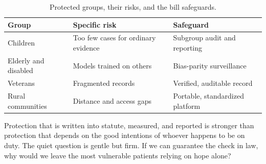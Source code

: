 \begin{table}[H]
\footnotesize
\begin{tabularx}{\textwidth}{@{}L{4.7cm} Y L{4.0cm}@{}}
\toprule
\textbf{Group} & \textbf{Specific risk} & \textbf{Safeguard}\\
\midrule
Children & Too few cases for ordinary evidence & Subgroup audit and reporting\\
Elderly and disabled & Models trained on others & Bias-parity surveillance\\
Veterans & Fragmented records & Verified, auditable record\\
Rural communities & Distance and access gaps & Portable, standardized platform\\
\bottomrule
\end{tabularx}
\caption{Protected groups, their risks, and the bill safeguards.}
\label{tab:protection}
\end{table}

Protection that is written into statute, measured, and reported is stronger than
protection that depends on the good intentions of whoever happens to be on duty.
The quiet question is gentle but firm. If we can guarantee the check in law, why
would we leave the most vulnerable patients relying on hope alone?
